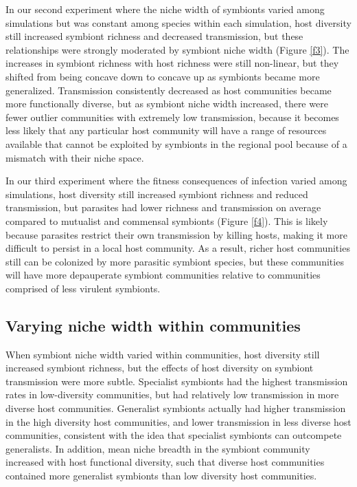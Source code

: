 \documentclass[12pt]{article}
\begin{document}
In our second experiment where the niche width of symbionts varied among simulations but was constant among species within each simulation, host diversity still increased symbiont richness and decreased transmission, but these relationships were strongly moderated by symbiont niche width (Figure \ref{f3}). 
The increases in symbiont richness with host richness were still non-linear, but they shifted from being concave down to concave up as symbionts became more generalized. 
Transmission consistently decreased as host communities became more functionally diverse, but as symbiont niche width increased, there were fewer outlier communities with extremely low transmission, because it becomes less likely that any particular host community will have a range of resources available that cannot be exploited by symbionts in the regional pool because of a mismatch with their niche space.

In our third experiment where the fitness consequences of infection varied among simulations, host diversity still increased symbiont richness and reduced transmission, but parasites had lower richness and transmission on average compared to mutualist and commensal symbionts (Figure \ref{f4}). 
This is likely because parasites restrict their own transmission by killing hosts, making it more difficult to persist in a local host community. 
As a result, richer host communities still can be colonized by more parasitic symbiont species, but these communities will have more depauperate symbiont communities relative to communities comprised of less virulent symbionts. 

\subsection*{Varying niche width within communities}

When symbiont niche width varied within communities, host diversity still increased symbiont richness, but the effects of host diversity on symbiont transmission were more subtle. 
Specialist symbionts had the highest transmission rates in low-diversity communities, but had relatively low transmission in more diverse host communities. 
Generalist symbionts actually had higher transmission in the high diversity host communities, and lower transmission in less diverse host communities, consistent with the idea that specialist symbionts can outcompete generalists. 
In addition, mean niche breadth in the symbiont community increased with host functional diversity, such that diverse host communities contained more generalist symbionts than low diversity host communities. 
\end{document}

